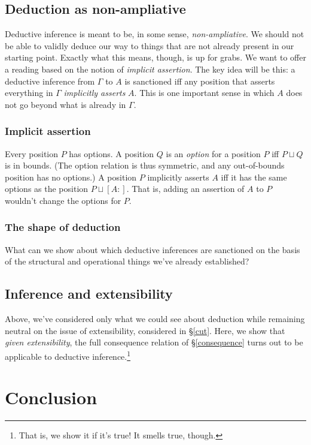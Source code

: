 \documentclass{article}
\newcommand{\G}{\ensuremath{\Gamma}}
\newcommand{\pcup}{\ensuremath{\sqcup}}
\newcommand{\pos}[2]{\ensuremath{[#1:#2]}}
\begin{document}
\subsection{Deduction as non-ampliative}

Deductive inference is meant to be, in some sense, {\em non-ampliative}.
We should not be able to validly deduce our way to things that are not already present in our starting point.
Exactly what this means, though, is up for grabs.
We want to offer a reading based on the notion of {\em implicit assertion}.
The key idea will be this: a deductive inference from $\G$ to $A$ is sanctioned iff any position that asserts everything in $\G$ {\em implicitly asserts} $A$.
This is one important sense in which $A$ does not go beyond what is already in $\G$.

\subsubsection{Implicit assertion}

Every position $P$ has options.
A position $Q$ is an {\em option} for a position $P$ iff $P \pcup Q$ is in bounds.
(The option relation is thus symmetric, and any out-of-bounds position has no options.)
A position $P$ implicitly asserts $A$ iff it has the same options as the position $P \pcup \pos{A}{}$.
That is, adding an assertion of $A$ to $P$ wouldn't change the options for $P$.

\subsubsection{The shape of deduction}

What can we show about which deductive inferences are sanctioned on the basis of the structural and operational things we've already established?


\subsection{Inference and extensibility}

Above, we've considered only what we could see about deduction while remaining neutral on the issue of extensibility, considered in \S\ref{cut}.
Here, we show that {\em given extensibility}, the full consequence relation of \S\ref{consequence} turns out to be applicable to deductive inference.\footnote{That is, we show it if it's true! It smells true, though.}


\section{Conclusion}






\end{document}
